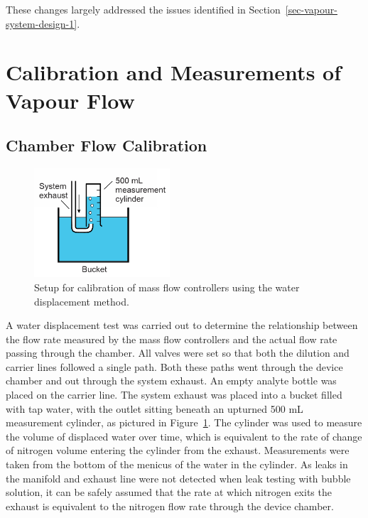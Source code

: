 \documentclass[
  a4paper,
]{scrbook}
\begin{document}
These changes largely addressed the issues identified in
Section~\ref{sec-vapour-system-design-1}.

\hypertarget{sec-calibration}{%
\section{Calibration and Measurements of Vapour
Flow}\label{sec-calibration}}

\hypertarget{sec-flow-calibration}{%
\subsection{Chamber Flow Calibration}\label{sec-flow-calibration}}

\begin{figure}

{\centering \includegraphics[width=0.45\textwidth,height=\textheight]{figures/ch5/water_displacement.png}

}

\caption{\label{fig-water-displacement}Setup for calibration of mass
flow controllers using the water displacement method.}

\end{figure}

A water displacement test was carried out to determine the relationship
between the flow rate measured by the mass flow controllers and the
actual flow rate passing through the chamber. All valves were set so
that both the dilution and carrier lines followed a single path. Both
these paths went through the device chamber and out through the system
exhaust. An empty analyte bottle was placed on the carrier line. The
system exhaust was placed into a bucket filled with tap water, with the
outlet sitting beneath an upturned 500 mL measurement cylinder, as
pictured in Figure~\ref{fig-water-displacement}. The cylinder was used
to measure the volume of displaced water over time, which is equivalent
to the rate of change of nitrogen volume entering the cylinder from the
exhaust. Measurements were taken from the bottom of the menicus of the
water in the cylinder. As leaks in the manifold and exhaust line were
not detected when leak testing with bubble solution, it can be safely
assumed that the rate at which nitrogen exits the exhaust is equivalent
to the nitrogen flow rate through the device chamber.
\end{document}
